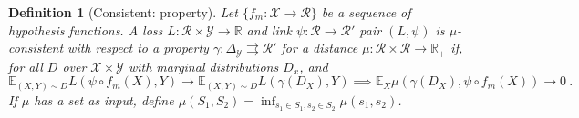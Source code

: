 \documentclass{article}
\newcommand{\Comments}{1}
\newcommand{\mynote}[2]{\ifnum\Comments=1\textcolor{#1}{#2}\fi}
\newcommand{\raf}[1]{\mynote{green}{[RF: #1]}}
\newcommand{\reals}{\mathbb{R}}
\newcommand{\simplex}{\Delta_\Y}
\newcommand{\E}{\mathbb{E}}
\newcommand{\R}{\mathcal{R}}
\newcommand{\X}{\mathcal{X}}
\newcommand{\Y}{\mathcal{Y}}
\newcommand{\toto}{\rightrightarrows}
\newtheorem{definition}{Definition}
\begin{document}
\begin{definition}[Consistent: property]
	Let $\{f_m: \X \to \R\}$ be a sequence of hypothesis functions.
	A loss $L : \R \times \Y \to \reals$ and link $\psi : \R \to \R'$ pair $(L, \psi)$ is \emph{$\mu$-consistent with respect to a property} $\gamma: \simplex \toto \R'$ for a distance $\mu:\R \times \R \to \reals_+$ if, for all $D$ over $\X \times \Y$ with marginal distributions $D_x$, and 
	\begin{equation}
	\E_{(X,Y) \sim D} L(\psi \circ f_m(X), Y) \to \E_{(X,Y) \sim D} L( \gamma(D_X), Y) \implies \E_X \mu(\gamma(D_X), \psi \circ f_m(X)) \to 0~.~
	\end{equation}
	If $\mu$ has a set as input, define $\mu(S_1, S_2) = \inf_{s_1 \in S_1, s_2 \in S_2} \mu(s_1, s_2)$.
\end{definition}


\end{document}
